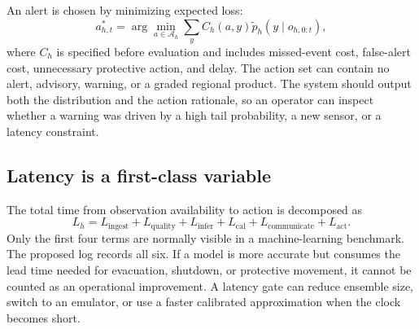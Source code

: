 \documentclass[conference]{IEEEtran}
\begin{document}
An alert is chosen by minimizing expected loss:
\begin{equation}
 a^*_{h,t}=\arg\min_{a\in\mathcal{A}_h}\sum_y C_h(a,y)\widetilde p_h(y\mid o_{h,0:t}),
 \label{eq:action}
\end{equation}
where $C_h$ is specified before evaluation and includes missed-event cost, false-alert cost, unnecessary protective action, and delay. The action set can contain no alert, advisory, warning, or a graded regional product. The system should output both the distribution and the action rationale, so an operator can inspect whether a warning was driven by a high tail probability, a new sensor, or a latency constraint.

\subsection{Latency is a first-class variable}

The total time from observation availability to action is decomposed as
\begin{equation}
 L_h=L_{\mathrm{ingest}}+L_{\mathrm{quality}}+L_{\mathrm{infer}}+L_{\mathrm{cal}}+L_{\mathrm{communicate}}+L_{\mathrm{act}}.
 \label{eq:latency}
\end{equation}
Only the first four terms are normally visible in a machine-learning benchmark. The proposed log records all six. If a model is more accurate but consumes the lead time needed for evacuation, shutdown, or protective movement, it cannot be counted as an operational improvement. A latency gate can reduce ensemble size, switch to an emulator, or use a faster calibrated approximation when the clock becomes short.
\end{document}
